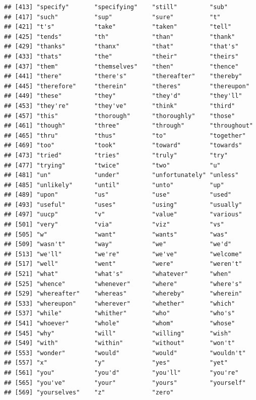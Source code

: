 \documentclass[]{book}
\begin{document}
\begin{verbatim}
## [413] "specify"       "specifying"    "still"         "sub"          
## [417] "such"          "sup"           "sure"          "t"            
## [421] "t's"           "take"          "taken"         "tell"         
## [425] "tends"         "th"            "than"          "thank"        
## [429] "thanks"        "thanx"         "that"          "that's"       
## [433] "thats"         "the"           "their"         "theirs"       
## [437] "them"          "themselves"    "then"          "thence"       
## [441] "there"         "there's"       "thereafter"    "thereby"      
## [445] "therefore"     "therein"       "theres"        "thereupon"    
## [449] "these"         "they"          "they'd"        "they'll"      
## [453] "they're"       "they've"       "think"         "third"        
## [457] "this"          "thorough"      "thoroughly"    "those"        
## [461] "though"        "three"         "through"       "throughout"   
## [465] "thru"          "thus"          "to"            "together"     
## [469] "too"           "took"          "toward"        "towards"      
## [473] "tried"         "tries"         "truly"         "try"          
## [477] "trying"        "twice"         "two"           "u"            
## [481] "un"            "under"         "unfortunately" "unless"       
## [485] "unlikely"      "until"         "unto"          "up"           
## [489] "upon"          "us"            "use"           "used"         
## [493] "useful"        "uses"          "using"         "usually"      
## [497] "uucp"          "v"             "value"         "various"      
## [501] "very"          "via"           "viz"           "vs"           
## [505] "w"             "want"          "wants"         "was"          
## [509] "wasn't"        "way"           "we"            "we'd"         
## [513] "we'll"         "we're"         "we've"         "welcome"      
## [517] "well"          "went"          "were"          "weren't"      
## [521] "what"          "what's"        "whatever"      "when"         
## [525] "whence"        "whenever"      "where"         "where's"      
## [529] "whereafter"    "whereas"       "whereby"       "wherein"      
## [533] "whereupon"     "wherever"      "whether"       "which"        
## [537] "while"         "whither"       "who"           "who's"        
## [541] "whoever"       "whole"         "whom"          "whose"        
## [545] "why"           "will"          "willing"       "wish"         
## [549] "with"          "within"        "without"       "won't"        
## [553] "wonder"        "would"         "would"         "wouldn't"     
## [557] "x"             "y"             "yes"           "yet"          
## [561] "you"           "you'd"         "you'll"        "you're"       
## [565] "you've"        "your"          "yours"         "yourself"     
## [569] "yourselves"    "z"             "zero"
\end{verbatim}
\end{document}

